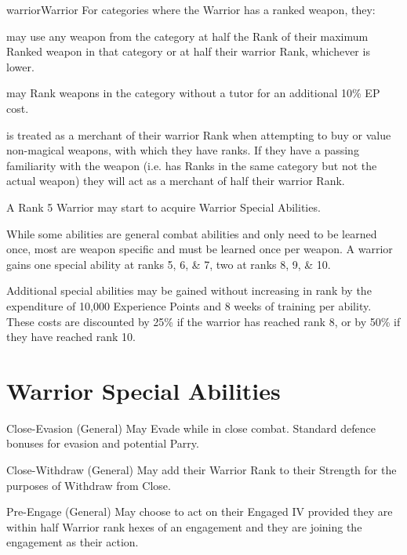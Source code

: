 \begin{Skill}[3.0]{warrior}{Warrior}
For categories where the Warrior has a ranked weapon, they:

\begin{Itemize}

\item may use any weapon from the category at half the Rank of their
  maximum Ranked weapon in that category or at half their warrior
  Rank, whichever is lower.

\item may Rank weapons in the category without a tutor for an
  additional 10\% EP cost.

\item is treated as a merchant of their warrior Rank when attempting
  to buy or value non-magical weapons, with which they have ranks.  If
  they have a passing familiarity with the weapon (i.e.  has Ranks in
  the same category but not the actual weapon) they will act as a
  merchant of half their warrior Rank.

\end{Itemize}

A Rank 5 Warrior may start to acquire Warrior Special Abilities.

While some abilities are general combat abilities and only need to be
learned once, most are weapon specific and must be learned once per
weapon.  A warrior gains one special ability at ranks 5, 6, \& 7, two
at ranks 8, 9, \& 10.

Additional special abilities may be gained without increasing in rank
by the expenditure of 10,000 Experience Points and 8 weeks of training
per ability.  These costs are discounted by 25\% if the warrior has
reached rank 8, or by 50\% if they have reached rank 10.

\section{Warrior Special Abilities}

\begin{Description}
\item[Close-Evasion (General)] May Evade while in close combat.
  Standard defence bonuses for evasion and potential Parry.

\item[Close-Withdraw (General)] May add their Warrior Rank to their
  Strength for the purposes of Withdraw from Close.

\item[Pre-Engage (General)] May choose to act on their Engaged IV
  provided they are within half Warrior rank hexes of an engagement
  and they are joining the engagement as their action.


\end{Description}
\end{Skill}
